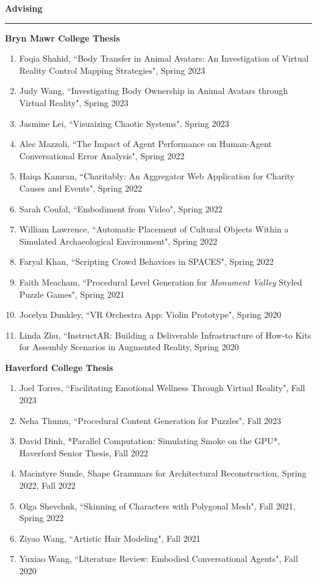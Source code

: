 \needspace{6em}
{\large {\bf Advising}}
\vspace{0.1cm}
\hrule
\medskip
\medskip

{\bf Bryn Mawr College Thesis }
\vspace{-1.0em}

\begin{enumerate}[leftmargin=*,label={}]
\item Foqia Shahid, ``Body Transfer in Animal Avatars: An Investigation of Virtual Reality Control Mapping Strategies", Spring 2023
\item Judy Wang, ``Investigating Body Ownership in Animal Avatars through Virtual Reality", Spring 2023
\item Jasmine Lei, ``Visuaizing Chaotic Systems", Spring 2023
\item Alec Mazzoli, ``The Impact of Agent Performance on Human-Agent Conversational Error Analysis", Spring 2022
\item Haiqa Kamran, ``Charitably: An Aggregator Web Application for Charity Causes and Events", Spring 2022
\item Sarah Coufal, ``Embodiment from Video", Spring 2022
\item William Lawrence, ``Automatic Placement of Cultural Objects Within a Simulated Archaeological Environment", Spring 2022
\item Faryal Khan, ``Scripting Crowd Behaviors in SPACES", Spring 2022 
\item Faith Meacham, ``Procedural Level Generation for \textit{Monument Valley} Styled Puzzle Games", Spring 2021
\item Jocelyn Dunkley, ``VR Orchestra App: Violin Prototype", Spring 2020
\item Linda Zhu, ``InstructAR: Building a Deliverable Infrastructure of How-to Kits for Assembly Scenarios in Augmented Reality, Spring 2020
\end{enumerate}

{\bf Haverford College Thesis}
\vspace{-1.0em}

\begin{enumerate}[leftmargin=*,label={}]
\item Joel Torres, ``Facilitating Emotional Wellness Through Virtual Reality", Fall 2023
\item Neha Thumu, ``Procedural Content Generation for Puzzles", Fall 2023
\item David Dinh, *Parallel Computation: Simulating Smoke on the GPU*, Haverford Senior Thesis, Fall 2022 
\item Macintyre Sunde, Shape Grammars for Architectural Reconstruction, Spring 2022, Fall 2022
\item Olga Shevchuk, ``Skinning of Characters with Polygonal Mesh", Fall 2021, Spring 2022
\item Ziyao Wang, ``Artistic Hair Modeling", Fall 2021
\item Yuxiao Wang, ``Literature Review: Embodied Conversational Agents", Fall 2020
\end{enumerate}

